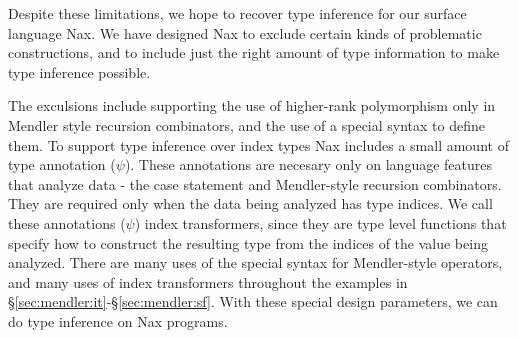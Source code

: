 Despite these limitations, we hope to recover
type inference for our surface language Nax. We have designed Nax to exclude
certain kinds of problematic constructions, and to include just the right amount
of type information to make type inference possible.

The exculsions include supporting the use of higher-rank polymorphism only in 
Mendler style recursion combinators, and the use of a special syntax to define them.
To support type inference over index types Nax includes a 
small amount of type annotation
($\psi$). These annotations are necesary only on language features that analyze data -
the case statement and Mendler-style recursion combinators. 
They are required only when the data being analyzed has type indices.
We call these annotations ($\psi$) index transformers,
since they are type level functions that specify how to construct
the resulting type from the indices of the value being analyzed.
There are many uses of the special syntax for Mendler-style
operators, and many uses of index transformers throughout the examples in
\S\ref{sec:mendler:it}-\S\ref{sec:mendler:sf}. 
With these special design parameters, we can do type inference on Nax programs.





